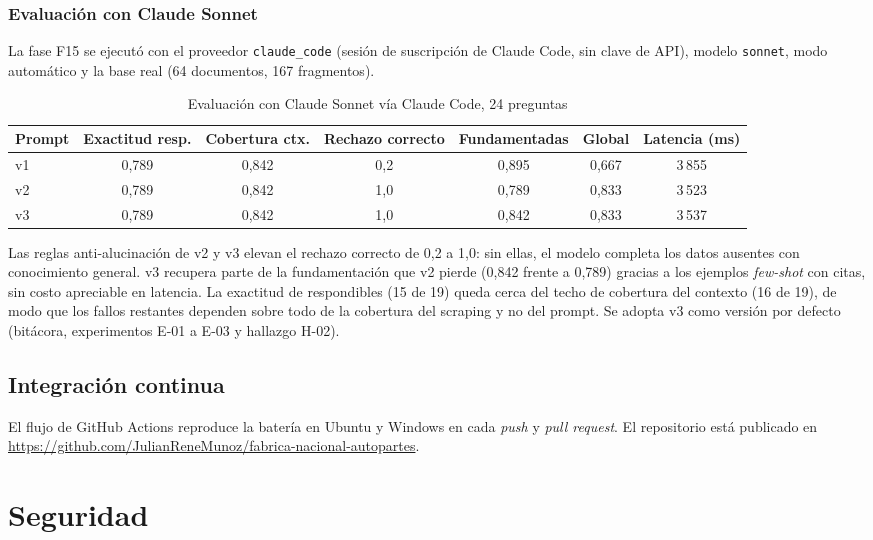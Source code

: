 \subsection*{Evaluación con Claude Sonnet}
La fase F15 se ejecutó con el proveedor \texttt{claude\_code} (sesión de suscripción de Claude Code, sin clave de
API), modelo \texttt{sonnet}, modo automático y la base real (64 documentos, 167 fragmentos).
\begin{table}[H]\centering\small
\caption{Evaluación con Claude Sonnet vía Claude Code, 24 preguntas}\label{tab:eval-claude}
\begin{tabular}{@{}lcccccc@{}}\toprule
Prompt & Exactitud resp. & Cobertura ctx. & Rechazo correcto & Fundamentadas & Global & Latencia (ms)\\\midrule
v1 & 0,789 & 0,842 & 0,2 & 0,895 & 0,667 & 3\,855\\
v2 & 0,789 & 0,842 & 1,0 & 0,789 & 0,833 & 3\,523\\
v3 & 0,789 & 0,842 & 1,0 & 0,842 & 0,833 & 3\,537\\\bottomrule
\end{tabular}
\end{table}
Las reglas anti-alucinación de v2 y v3 elevan el rechazo correcto de 0,2 a 1,0: sin ellas, el modelo completa los
datos ausentes con conocimiento general. v3 recupera parte de la fundamentación que v2 pierde (0,842 frente a
0,789) gracias a los ejemplos \emph{few-shot} con citas, sin costo apreciable en latencia. La exactitud de
respondibles (15 de 19) queda cerca del techo de cobertura del contexto (16 de 19), de modo que los fallos
restantes dependen sobre todo de la cobertura del scraping y no del prompt. Se adopta v3 como versión por defecto
(bitácora, experimentos E-01 a E-03 y hallazgo H-02).

\section{Integración continua}
El flujo de GitHub Actions reproduce la batería en Ubuntu y Windows en cada \emph{push} y \emph{pull request}.
El repositorio está publicado en \url{https://github.com/JulianReneMunoz/fabrica-nacional-autopartes}.

\chapter{Seguridad}\label{cap:seguridad}

